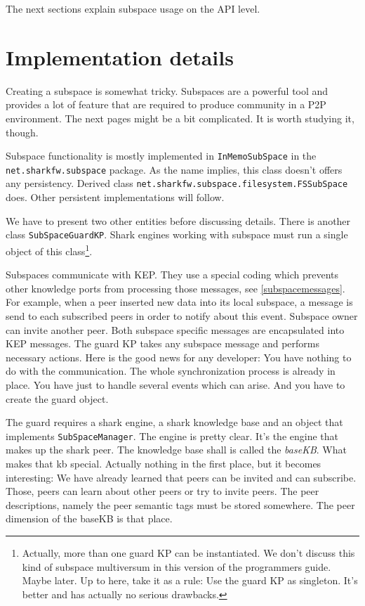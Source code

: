 The next sections explain subspace usage on the API level.

\section{Implementation details}
Creating a subspace is somewhat tricky. Subspaces are a powerful tool and
provides a lot of feature that are required to produce community in a P2P 
environment. The next pages might be a bit complicated. It is worth studying it, though.

Subspace functionality is mostly implemented in {\tt InMemoSubSpace} in the 
{\tt net.sharkfw.subspace} package. As the name implies, this class doesn't offers any persistency. Derived class {\tt net.sharkfw.subspace.filesystem.FSSubSpace} does. Other persistent implementations will follow.

We have to present two other entities before discussing details. 
There is another class {\tt SubSpaceGuardKP}. Shark engines working with subspace must run a single object of this class\footnote{Actually, more than
one guard KP can be instantiated. We don't discuss this kind of subspace multiversum in this version of the programmers guide. Maybe later. Up to here, take it as a rule: Use the guard KP as singleton. It's better and has actually no serious drawbacks.}.

Subspaces communicate with KEP. They use a special coding which prevents other knowledge ports from processing those messages, see \ref{subspacemessages}.
For example, when a peer inserted new data into its local subspace, a message is
send to each subscribed peers in order to notify about this event. Subspace owner can
invite another peer. Both subspace specific messages are encapsulated into KEP messages. The guard KP takes any subspace message and performs necessary actions. Here is the good news for any developer: You have nothing to do with the communication. The whole synchronization process is already in place. You have just to handle several events which can arise. And you have to create the guard object.

The guard requires a shark engine, a shark knowledge base and an object that implements {\tt SubSpaceManager}. The engine is pretty clear. It's the engine that makes up the shark peer. The knowledge base shall is called the {\it baseKB}. What makes that kb special. Actually nothing in the first place, but it becomes interesting: We have already learned that peers can be invited and can subscribe. Those, peers can learn about other peers or try to invite peers. The peer descriptions, namely the peer semantic tags must be stored somewhere. The peer dimension of the baseKB is that place. 

